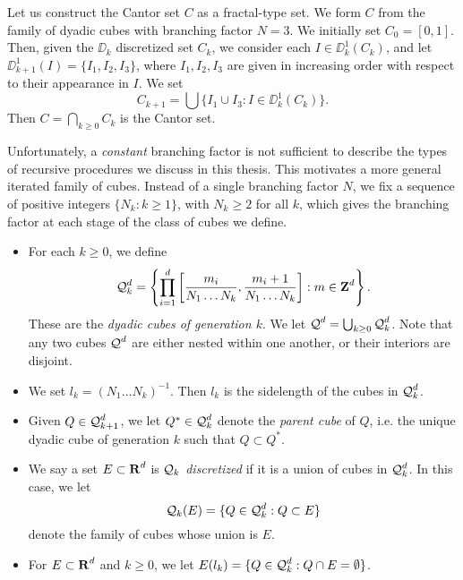 \begin{example}
	Let us construct the Cantor set $C$ as a fractal-type set. We form $C$ from the family of dyadic cubes with branching factor $N = 3$. We initially set $C_0 = [0,1]$. Then, given the $\DD_k$ discretized set $C_k$, we consider each $I \in \DD_k^1(C_k)$, and let $\DD_{k+1}^1(I) = \{ I_1, I_2, I_3 \}$, where $I_1, I_2, I_3$ are given in increasing order with respect to their appearance in $I$. We set
	\[ C_{k+1} = \bigcup \{ I_1 \cup I_3 : I \in \DD_k^1(C_k) \}. \]
	Then $C = \bigcap_{k \geq 0} C_k$ is the Cantor set.
\end{example}

Unfortunately, a \emph{constant} branching factor is not sufficient to describe the types of recursive procedures we discuss in this thesis. This motivates a more general iterated family of cubes. Instead of a single branching factor $N$, we fix a sequence of positive integers $\{ N_k : k \geq 1 \}$, with $N_k \geq 2$ for all $k$, which gives the branching factor at each stage of the class of cubes we define.
%
\begin{itemize}
	\item For each $k \geq 0$, we define 
	\[ \operatorname{\mathcal{Q}}_k^d = \left\{ \prod_{i = 1}^d \left[ \frac{m_i}{N_1 \dots N_k}, \frac{m_i + 1}{N_1 \dots N_k} \right] : m \in \operatorname{\mathbf{Z}}^d \right\}. \]
	These are the \emph{dyadic cubes of generation $k$}. We let $\operatorname{\mathcal{Q}}^d = \bigcup_{k \geq 0} \operatorname{\mathcal{Q}}_k^d$. Note that any two cubes $\operatorname{\mathcal{Q}}^d$ are either nested within one another, or their interiors are disjoint.

	\item We set $l_k = (N_1 \dots N_k)^{-1}$. Then $l_k$ is the sidelength of the cubes in $\operatorname{\mathcal{Q}}_k^d$.

	\item Given $Q \in \operatorname{\mathcal{Q}}_{k+1}^d$, we let $Q^* \in \operatorname{\mathcal{Q}}_k^d$ denote the \emph{parent cube} of $Q$, i.e. the unique dyadic cube of generation $k$ such that $Q \subset Q^*$.

	\item We say a set $E \subset \operatorname{\mathbf{R}}^d$ is \emph{$\operatorname{\mathcal{Q}}_k$ discretized} if it is a union of cubes in $\operatorname{\mathcal{Q}}_k^d$. In this case, we let
	\[ \operatorname{\mathcal{Q}}_k(E) = \{ Q \in \operatorname{\mathcal{Q}}_k^d: Q \subset E \} \]
	denote the family of cubes whose union is $E$.

	\item For $E \subset \operatorname{\mathbf{R}}^d$ and $k \geq 0$, we let $E(l_k) = \{ Q \in \operatorname{\mathcal{Q}}_k^d : Q \cap E = \emptyset \}$.
\end{itemize}
%
